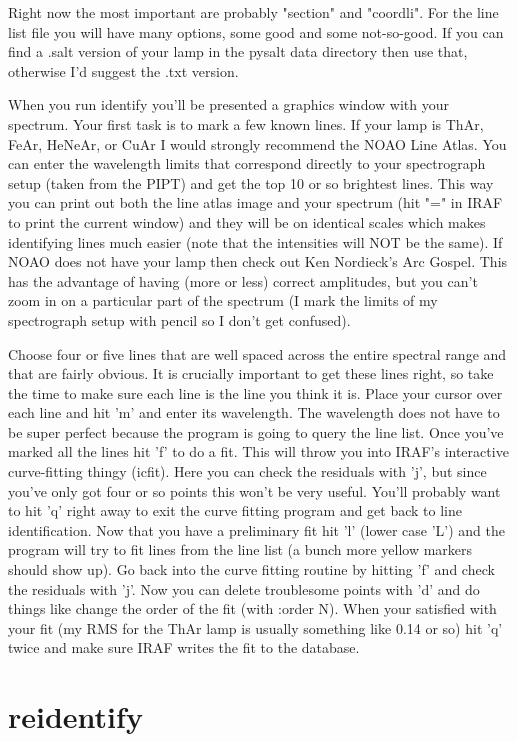 \documentclass[letter,11pt,oneside]{article}
\begin{document}
Right now the most important are probably "section" and "coordli". For
the line list file you will have many options, some good and some
not-so-good. If you can find a .salt version of your lamp in the
pysalt data directory then use that, otherwise I'd suggest the .txt
version.

When you run identify you'll be presented a graphics window with your
spectrum. Your first task is to mark a few known lines. If your lamp
is ThAr, FeAr, HeNeAr, or CuAr I would strongly recommend the NOAO
Line Atlas. You can enter the wavelength limits that correspond
directly to your spectrograph setup (taken from the PIPT) and get the
top 10 or so brightest lines. This way you can print out both the line
atlas image and your spectrum (hit "=" in IRAF to print the current
window) and they will be on identical scales which makes identifying
lines much easier (note that the intensities will NOT be the same). If
NOAO does not have your lamp then check out Ken Nordieck's Arc
Gospel. This has the advantage of having (more or less) correct
amplitudes, but you can't zoom in on a particular part of the spectrum
(I mark the limits of my spectrograph setup with pencil so I don't get
confused).

Choose four or five lines that are well spaced across the entire
spectral range and that are fairly obvious. It is crucially important
to get these lines right, so take the time to make sure each line is
the line you think it is. Place your cursor over each line and hit 'm'
and enter its wavelength. The wavelength does not have to be super
perfect because the program is going to query the line list. Once
you've marked all the lines hit 'f' to do a fit. This will throw you
into IRAF's interactive curve-fitting thingy (icfit). Here you can
check the residuals with 'j', but since you've only got four or so
points this won't be very useful. You'll probably want to hit 'q'
right away to exit the curve fitting program and get back to line
identification. Now that you have a preliminary fit hit 'l' (lower
case 'L') and the program will try to fit lines from the line list (a
bunch more yellow markers should show up). Go back into the curve
fitting routine by hitting 'f' and check the residuals with 'j'. Now
you can delete troublesome points with 'd' and do things like change
the order of the fit (with :order N). When your satisfied with your
fit (my RMS for the ThAr lamp is usually something like 0.14 or so)
hit 'q' twice and make sure IRAF writes the fit to the database.

\section{reidentify}
\end{document}
